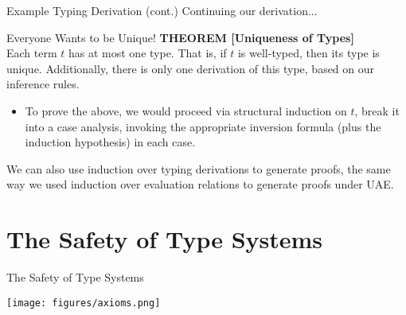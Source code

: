 \documentclass[11pt]{beamer}
\begin{document}
\begin{frame}[fragile=singleslide]{Example Typing Derivation (cont.)}
Continuing our derivation... 
{\tiny
\begin{flagderiv}
\end{flagderiv}}

\end{frame}

\begin{frame}[fragile=singleslide]{Everyone Wants to be Unique!}
\textbf{THEOREM [Uniqueness of Types]} \\
Each term $t$ has at most one type.  That is, if $t$ is well-typed, then its type is unique.  Additionally, there is only one derivation of this type, based on our inference rules.  
\begin{itemize}
\item To prove the above, we would proceed via structural induction on $t$, break it into a case analysis, invoking the appropriate inversion formula (plus the induction hypothesis) in each case.  
\end{itemize}
We can also use induction over typing derivations to generate proofs, the same way we used induction over evaluation relations to generate proofs under UAE.  
\end{frame}

\section[Soundness]{The Safety of Type Systems}
\begin{frame}[fragile=singleslide]{The Safety of Type Systems}
\begin{center}
\texttt{[image: figures/axioms.png]}
\end{center}
\end{frame}
\end{document}
